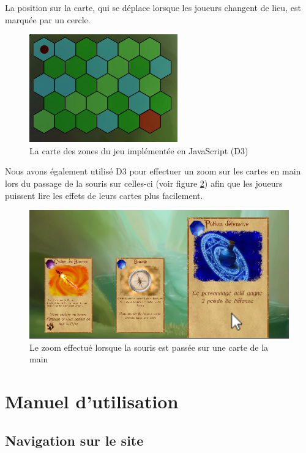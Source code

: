 \documentclass[12pt]{report}
\begin{document}
	La position sur la carte, qui se déplace lorsque les joueurs changent de lieu, est marquée par un cercle.

	\begin{figure}[h!]
		\centering
		\includegraphics[scale=0.8]{images/map.png}
		\caption{La carte des zones du jeu implémentée en JavaScript (D3)}
		\label{fig:map}
	\end{figure}

    Nous avons également utilisé D3 pour effectuer un zoom sur les cartes en main lors du passage de la souris sur celles-ci (voir figure \ref{fig:zoom}) afin que les joueurs puissent lire les effets de leurs cartes plus facilement.

	\begin{figure}[h!]
		\centering
		\includegraphics[scale=0.6]{images/zoom.png}
		\caption{Le zoom effectué lorsque la souris est passée sur une carte de la main}
		\label{fig:zoom}
	\end{figure}

\chapter{Manuel d'utilisation}

	\section{Navigation sur le site}
\end{document}
